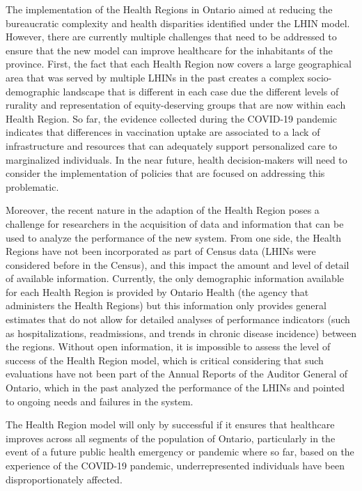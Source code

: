 \documentclass[
]{article}
\begin{document}
The implementation of the Health Regions in Ontario aimed at reducing
the bureaucratic complexity and health disparities identified under the
LHIN model. However, there are currently multiple challenges that need
to be addressed to ensure that the new model can improve healthcare for
the inhabitants of the province. First, the fact that each Health Region
now covers a large geographical area that was served by multiple LHINs
in the past creates a complex socio-demographic landscape that is
different in each case due the different levels of rurality and
representation of equity-deserving groups that are now within each
Health Region. So far, the evidence collected during the COVID-19
pandemic indicates that differences in vaccination uptake are associated
to a lack of infrastructure and resources that can adequately support
personalized care to marginalized individuals. In the near future,
health decision-makers will need to consider the implementation of
policies that are focused on addressing this problematic.

Moreover, the recent nature in the adaption of the Health Region poses a
challenge for researchers in the acquisition of data and information
that can be used to analyze the performance of the new system. From one
side, the Health Regions have not been incorporated as part of Census
data (LHINs were considered before in the Census), and this impact the
amount and level of detail of available information. Currently, the only
demographic information available for each Health Region is provided by
Ontario Health (the agency that administers the Health Regions) but this
information only provides general estimates that do not allow for
detailed analyses of performance indicators (such as hospitalizations,
readmissions, and trends in chronic disease incidence) between the
regions. Without open information, it is impossible to assess the level
of success of the Health Region model, which is critical considering
that such evaluations have not been part of the Annual Reports of the
Auditor General of Ontario, which in the past analyzed the performance
of the LHINs and pointed to ongoing needs and failures in the system.

The Health Region model will only by successful if it ensures that
healthcare improves across all segments of the population of Ontario,
particularly in the event of a future public health emergency or
pandemic where so far, based on the experience of the COVID-19 pandemic,
underrepresented individuals have been disproportionately affected.
\end{document}
